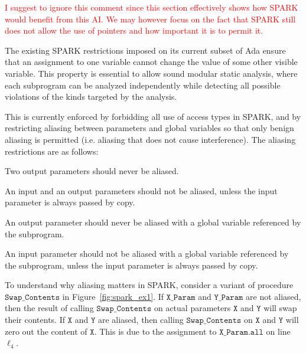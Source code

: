\documentclass{llncs}
\newcommand\maroua[1]{\textcolor{red}{#1}}
\newcommand\var[1]{\ensuremath{\mathtt{#1}}}
\begin{document}

\maroua{I suggest to ignore this comment since this section effectively shows how SPARK would benefit from this AI. We may however focus on the fact that SPARK still does not
allow the use of pointers and how important it is to permit it.}

The existing SPARK restrictions imposed on its current subset of Ada ensure that an assignment to one variable cannot change the value of some other visible variable. This property is essential to allow sound modular static analysis,
where each subprogram can be analyzed independently while detecting all possible violations of the kinds targeted by the analysis.

This is currently enforced by forbidding all use of access types in SPARK, and by restricting aliasing between parameters and global variables so that only
benign aliasing is permitted (i.e. aliasing that does not cause interference).  The aliasing restrictions are as follows:


\begin{compactitem}
  \item Two output parameters should never be aliased.
  \item An input and an output parameters should not be aliased, unless the input parameter is always passed by copy.
  \item An output parameter should never be aliased with a global variable referenced by the subprogram.
  \item An input parameter should not be aliased with a global variable referenced by the subprogram, unless the input parameter is always passed by copy.
\end{compactitem}

To understand why aliasing matters in SPARK, consider a variant of procedure \var{Swap\_Contents} in Figure~\ref{fig:spark_ex1}. If \var{X\_Param} and \var{Y\_Param}
are not aliased, then the result of calling \var{Swap\_Contents} on actual parameters \var{X} and \var{Y} will swap their contents. If \var{X} and \var{Y} are aliased, then calling
\var{Swap\_Contents} on \var{X} and \var{Y} will zero out the content of \var{X}. This is due to the assignment to \var{X\_Param.all} on line $\ell_4$.
\end{document}
